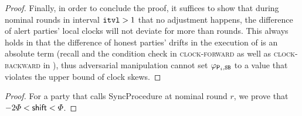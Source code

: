 \begin{proof}
    Finally, in order to conclude the proof, it suffices to show that during nominal rounds in interval $\mathtt{itvl} > 1$ that no adjustment happens, the difference of alert parties' local clocks will not deviate for more than \maxskew rounds.
    This always holds in that the difference of honest parties' drifts in the execution of \timekeeper is an absolute term (recall \maxdrift and the condition check in \textsc{clock-forward} as well as \textsc{clock-backward} in \funcImpClock), thus adversarial manipulation cannot set $\varphi_{\mathsf{P}_i, \mathtt{SB}}$ to a value that violates the upper bound of clock skews.
\end{proof}

\lemmagoodshift

\begin{proof}
    For a party \party that calls \textsf{SyncProcedure} at nominal round $r$, we prove that $-2\varPhi < \mathsf{shift} < \varPhi$.


\end{proof}

